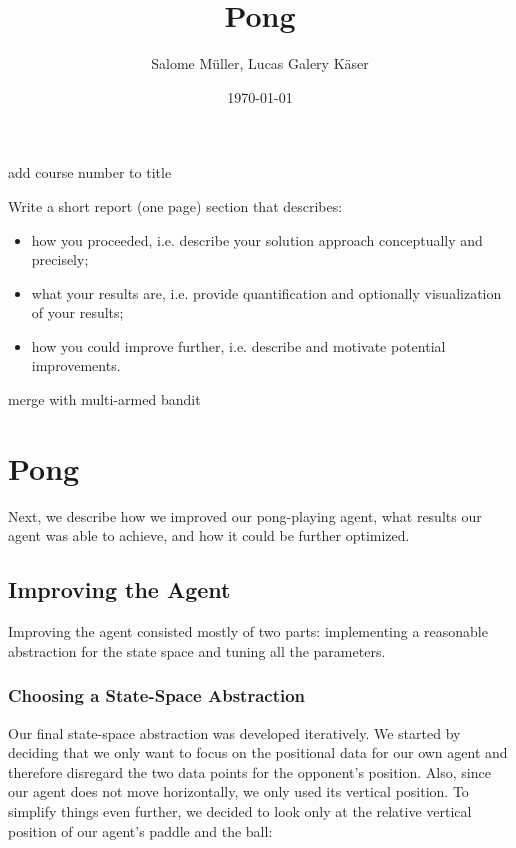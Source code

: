 \documentclass[10pt]{article}
\title{Pong}
\author{Salome Müller, Lucas Galery Käser}
\date{\today}
\newcommand{\todo}[1]{{\color{red}#1}}
\begin{document}
    \maketitle

    \todo{add course number to title}

    \todo{
    Write a short report (one page) section that describes:
    \begin{itemize}
        \item how you proceeded, i.e. describe your solution approach conceptually and precisely;\\
        \item what your results are, i.e. provide quantification and optionally visualization of your results;\\
        \item how you could improve further, i.e. describe and motivate potential improvements.\\
    \end{itemize}

    }

    \todo{merge with multi-armed bandit}

    \pagebreak


    \section{Pong}\label{sec:pong}
    Next, we describe how we improved our pong-playing agent, what results our agent was able to achieve, and how it could be further optimized.

    \subsection{Improving the Agent}\label{subsec:improving-the-agent}
    Improving the agent consisted mostly of two parts: implementing a reasonable abstraction for the state space and tuning all the parameters.

    \subsubsection{Choosing a State-Space Abstraction}
    Our final state-space abstraction was developed iteratively.
    We started by deciding that we only want to focus on the positional data for our own agent and therefore disregard the two data points for the opponent's position.
    Also, since our agent does not move horizontally, we only used its vertical position.
    To simplify things even further, we decided to look only at the relative vertical position of our agent's paddle and the ball:
\end{document}
